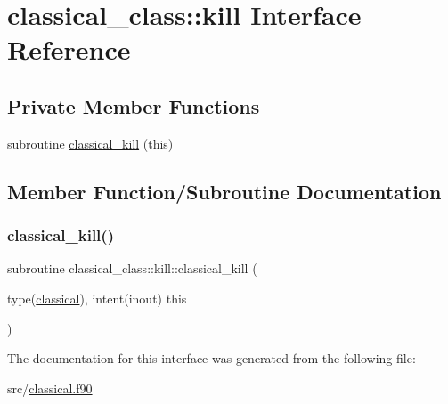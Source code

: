 \hypertarget{interfaceclassical__class_1_1kill}{}\section{classical\+\_\+class\+:\+:kill Interface Reference}
\label{interfaceclassical__class_1_1kill}
\subsection*{Private Member Functions}
\begin{DoxyCompactItemize}
\item 
subroutine \hyperlink{interfaceclassical__class_1_1kill_a3b424d9287e4b6c3590b13014aaa106b}{classical\+\_\+kill} (this)
\end{DoxyCompactItemize}


\subsection{Member Function/\+Subroutine Documentation}
\mbox{\label{interfaceclassical__class_1_1kill_a3b424d9287e4b6c3590b13014aaa106b}} 
\subsubsection{\texorpdfstring{classical\+\_\+kill()}{classical\_kill()}}
{\footnotesize\ttfamily subroutine classical\+\_\+class\+::kill\+::classical\+\_\+kill (\begin{DoxyParamCaption}\item[{type(\hyperlink{structclassical__class_1_1classical}{classical}), intent(inout)}]{this }\end{DoxyParamCaption})\hspace{0.3cm}{\ttfamily [private]}}



The documentation for this interface was generated from the following file\+:\begin{DoxyCompactItemize}
\item 
src/\hyperlink{classical_8f90}{classical.\+f90}\end{DoxyCompactItemize}
